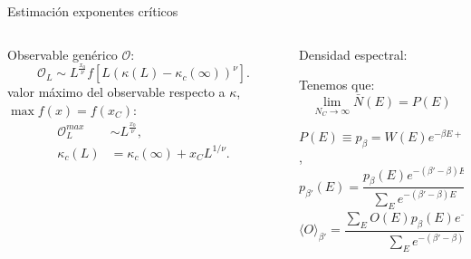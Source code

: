 \documentclass[xcolor=dvipsnames]{beamer}
\begin{document}
\begin{frame}{Estimación exponentes críticos}
\begin{columns}
  \begin{column}{5.8cm}
    Observable genérico $\mathcal{O}$:
    \begin{equation*}
      \mathcal{O}_L\sim L^{\frac{x_0}{\nu}}f\left[L (\kappa(L)-\kappa_c(\infty))^{\nu}\right].
    \end{equation*}
  valor máximo del observable respecto a $\kappa$, $\max f(x)=f(x_C)$:
  \begin{align*}
    \mathcal{O}^{max}_L& \sim L^{\frac{x_0}{\nu}},\\
    \kappa_c(L)&=\kappa_c(\infty)+x_CL^{1/\nu}.
  \end{align*}
  \end{column}
  \begin{column}{5.8cm}
    {\color{fblue} Densidad espectral:}

    Tenemos que:
    \begin{equation*}
      \lim _{N_C\rightarrow \infty}\bar{N}(E)=P(E)
    \end{equation*}

    $P(E)\equiv p_{\beta}=W(E)e^{-\beta E+f}$,
    \begin{equation*}
      p_{\beta'}(E)=\frac{p_{\beta}(E)e^{-(\beta'-\beta)E}}{\sum_E e^{-(\beta'-\beta)E}},
    \end{equation*}
    \centering
    \begin{equation*}
      \langle O\rangle_{\beta'}=\frac{\sum_E  O(E)p_{\beta}(E) e^{-(\beta'-\beta)E}}{\sum_E e^{-(\beta'-\beta)E}},
    \end{equation*}
  \end{column}
\end{columns}
\end{frame}
\end{document}
